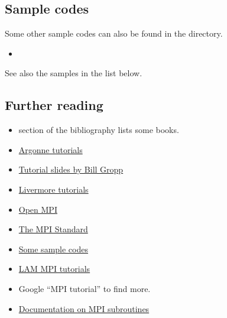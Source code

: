 \documentclass[letterpaper,10pt,english]{sphinxmanual}
\begin{document}
\subsection{Sample codes}
\label{mpi:sample-codes}
Some other sample codes can also be found in the  directory.
\begin{itemize}
\item {} 
{\hyperref[jacobi1d_mpi:jacobi1d\string-mpi]{}}

\end{itemize}

See also the samples in the list below.


\subsection{Further reading}
\label{mpi:further-reading}\begin{itemize}
\item {} 
{\hyperref[biblio:biblio\string-mpi]{}} section of the bibliography lists some books.

\item {} 
\href{http://www.mcs.anl.gov/research/projects/mpi/tutorial/}{Argonne tutorials}

\item {} 
\href{http://www.mcs.anl.gov/research/projects/mpi/tutorial/gropp/talk.html}{Tutorial slides by Bill Gropp}

\item {} 
\href{https://computing.llnl.gov/tutorials/mpi/}{Livermore tutorials}

\item {} 
\href{http://www.open-mpi.org/}{Open MPI}

\item {} 
\href{http://www.mcs.anl.gov/research/projects/mpi/}{The MPI Standard}

\item {} 
\href{http://www.mcs.anl.gov/research/projects/mpi/usingmpi/examples/simplempi/main.htm}{Some sample codes}

\item {} 
\href{http://www.lam-mpi.org/tutorials/}{LAM MPI tutorials}

\item {} 
Google ``MPI tutorial'' to find more.

\item {} 
\href{http://www.mcs.anl.gov/research/projects/mpi/www/www3/}{Documentation on MPI subroutines}

\end{itemize}
\end{document}
